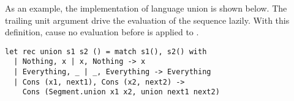 As an example, the implementation of language union is shown below.
The trailing unit argument \code{()} drive the evaluation of the
sequence lazily. With this definition,  cause no
evaluation before is applied to \code{()}.
\begin{lstlisting}
let rec union s1 s2 () = match s1(), s2() with
  | Nothing, x | x, Nothing -> x
  | Everything, _ | _, Everything -> Everything
  | Cons (x1, next1), Cons (x2, next2) -> 
    Cons (Segment.union x1 x2, union next1 next2)
\end{lstlisting}






